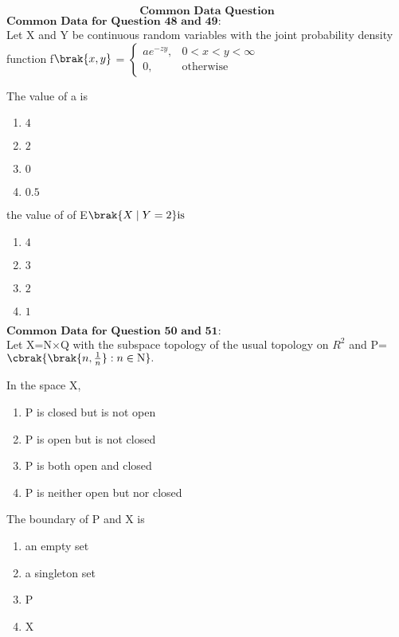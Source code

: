 \bigskip
$$\textbf{Common Data Question}$$
$\textbf{Common Data for  Question 48 and 49:}$\\
Let X and Y be continuous random variables with the joint probability density  function
f$\brak{x, y}$ = 
$\begin{cases} 
    ae^{-zy}, & 0 < x < y < \infty \\ 
    0, & \text{otherwise} 
\end{cases}$
\item The value of a is 
\begin{multicols}{4}
    \begin{enumerate}
        \item $4$
        \item $2$
        \item $0$
        \item $0.5$
    \end{enumerate}
\end{multicols}
\bigskip
\item the value of of E$\brak{X\mid Y=2}\text{is} $
\begin{multicols}{4}
    \begin{enumerate}
        \item $4$
        \item $3$
        \item $2$
        \item $1$
    \end{enumerate}
\end{multicols}
\bigskip
$\textbf{Common Data for  Question 50 and 51:}$\\
Let X=N$\times$Q with the subspace topology of the usual topology on $R^{2}$ and P=$\cbrak{\brak{n,\frac{1}{n}}:n\in \text{N}}.$
\bigskip
\item In the space X, 
\begin{multicols}{2}
    \begin{enumerate}
        \item P is closed but is not open 
        \item P is open but is not closed 
        \item P is both  open and  closed 
        \item P is neither open but nor closed 
    \end{enumerate}
\end{multicols}
\bigskip
\item The boundary of P and X is 
\begin{multicols}{4}
    \begin{enumerate}
        \item an empty set 
        \item a singleton set  
        \item P 
        \item X 
    \end{enumerate}
\end{multicols}
